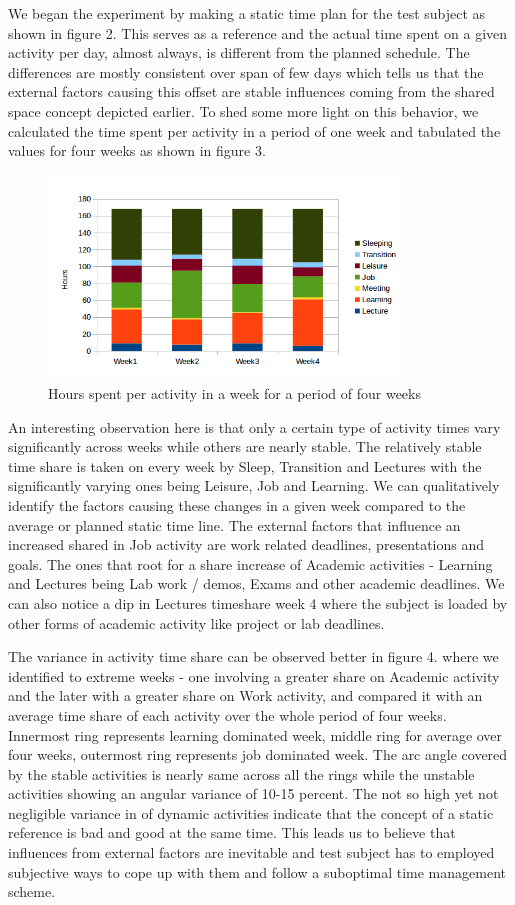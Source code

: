 \documentclass[conference]{IEEEtran}
\begin{document}
We began the experiment by making a static time plan for the test subject as shown in figure 2. This serves as a reference and the actual time spent on a given activity per day, almost always, is different from the planned schedule. The differences are mostly consistent over span of few days which tells us that the external factors causing this offset are stable influences coming from the shared space concept depicted earlier. To shed some more light on this behavior, we calculated the time spent per activity in a period of one week and tabulated the values for four weeks as shown in figure 3. 

\begin{figure}[hb]
  \centering
  \includegraphics[width=3.7in]{bar}
  \caption[]
   {Hours spent per activity in a week for a period of four weeks}
\end{figure}

An interesting observation here is that only a certain type of activity times vary significantly across weeks while others are nearly stable. The relatively stable time share is taken on every week by Sleep, Transition and Lectures with the significantly varying ones being Leisure, Job and Learning. We can qualitatively identify the factors causing these changes in a given week compared to the average or planned static time line. The external factors that influence an increased shared in Job activity are work related deadlines, presentations and goals. The ones that root for a share increase of Academic activities - Learning and Lectures being Lab work / demos, Exams and other academic deadlines. We can also notice a dip in Lectures timeshare week 4 where the subject is loaded by other forms of academic activity like project or lab deadlines. 

The variance in activity time share can be observed better in figure 4. where we identified to extreme weeks - one involving a greater share on Academic activity and the later with a greater share on Work activity, and compared it with an average time share of each activity over the whole period of four weeks. Innermost ring represents learning dominated week, middle ring for average over four weeks, outermost ring represents job dominated week. The arc angle covered by the stable activities is nearly same across all the rings while the unstable activities showing an angular variance of 10-15 percent. The not so high yet not negligible variance in of dynamic activities indicate that the concept of a static reference is bad and good at the same time. This leads us to believe that influences from external factors are inevitable and test subject has to employed subjective ways to cope up with them and follow a suboptimal time management scheme.
\end{document}
